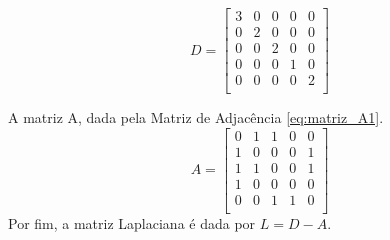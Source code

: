\begin{equation}\label{eq:matriz_d1}
    D = \begin{bmatrix}
         3 & 0 & 0 & 0 & 0 \\ %
         0 & 2 & 0 & 0 & 0 \\ %
         0 & 0 & 2 & 0 & 0 \\ %
         0 & 0 & 0 & 1 & 0 \\ %
         0 & 0 & 0 & 0 & 2 \\ %
    \end{bmatrix}
\end{equation}

A matriz A, dada pela Matriz de Adjacência \ref{eq:matriz_A1}.
\begin{equation}\label{eq:matriz_A1}
    A = \begin{bmatrix}
         0 & 1 & 1 & 0 & 0 \\ %
         1 & 0 & 0 & 0 & 1 \\ %
         1 & 1 & 0 & 0 & 1 \\ %
         1 & 0 & 0 & 0 & 0 \\ %
         0 & 0 & 1 & 1 & 0 \\ %
    \end{bmatrix}
\end{equation}
Por fim, a matriz Laplaciana é dada por $L = D - A$.

